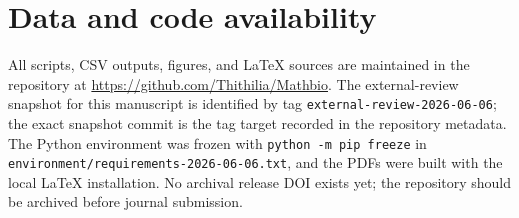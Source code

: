 \documentclass[11pt]{article}
\begin{document}
\section*{Data and code availability}

All scripts, CSV outputs, figures, and LaTeX sources are maintained in the repository at \url{https://github.com/Thithilia/Mathbio}. The external-review snapshot for this manuscript is identified by tag \texttt{external-review-2026-06-06}; the exact snapshot commit is the tag target recorded in the repository metadata. The Python environment was frozen with \texttt{python -m pip freeze} in \texttt{environment/requirements-2026-06-06.txt}, and the PDFs were built with the local \LaTeX{} installation. No archival release DOI exists yet; the repository should be archived before journal submission.



\end{document}
